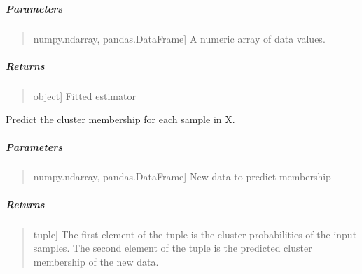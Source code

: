 \documentclass[letterpaper,10pt,english,openany,oneside]{sphinxmanual}
\begin{document}
{{{{\begin{fulllineitems}
\subparagraph{Parameters}
\label{\detokenize{api_reference/generated/QuadratiK.spherical_clustering.PKBC:id1}}\begin{quote}
\begin{description}
\sphinxlineitem{dat}{[}numpy.ndarray, pandas.DataFrame{]}
\sphinxAtStartPar
A numeric array of data values.

\end{description}
\end{quote}


\subparagraph{Returns}
\label{\detokenize{api_reference/generated/QuadratiK.spherical_clustering.PKBC:returns}}\begin{quote}
\begin{description}
\sphinxlineitem{self}{[}object{]}
\sphinxAtStartPar
Fitted estimator

\end{description}
\end{quote}

\end{fulllineitems}


\begin{fulllineitems}
\label{\detokenize{api_reference/generated/QuadratiK.spherical_clustering.PKBC:QuadratiK.spherical_clustering.PKBC.predict}}
\pysigstartsignatures
{}
\pysigstopsignatures
\sphinxAtStartPar
Predict the cluster membership for each sample in X.


\subparagraph{Parameters}
\label{\detokenize{api_reference/generated/QuadratiK.spherical_clustering.PKBC:id2}}\begin{quote}
\begin{description}
\sphinxlineitem{X}{[}numpy.ndarray, pandas.DataFrame{]}
\sphinxAtStartPar
New data to predict membership

\end{description}
\end{quote}


\subparagraph{Returns}
\label{\detokenize{api_reference/generated/QuadratiK.spherical_clustering.PKBC:id3}}\begin{quote}
\begin{description}
\sphinxlineitem{(Cluster Probabilities, Membership)}{[}tuple{]}
\sphinxAtStartPar
The first element of the tuple is the cluster probabilities of the input samples.
The second element of the tuple is the predicted cluster membership of the new data.


\end{description}
\end{quote}
\end{fulllineitems}}}}}
\end{document}
